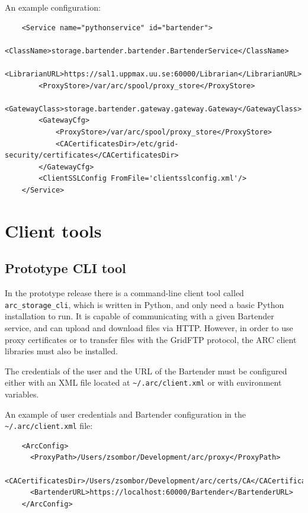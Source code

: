 \documentclass{book}
\begin{document}
An example configuration:

\begin{verbatim}
    <Service name="pythonservice" id="bartender">
        <ClassName>storage.bartender.bartender.BartenderService</ClassName>
        <LibrarianURL>https://sal1.uppmax.uu.se:60000/Librarian</LibrarianURL>
        <ProxyStore>/var/arc/spool/proxy_store</ProxyStore>
        <GatewayClass>storage.bartender.gateway.gateway.Gateway</GatewayClass>
        <GatewayCfg>
            <ProxyStore>/var/arc/spool/proxy_store</ProxyStore>
            <CACertificatesDir>/etc/grid-security/certificates</CACertificatesDir>
        </GatewayCfg>
        <ClientSSLConfig FromFile='clientsslconfig.xml'/>
    </Service>
\end{verbatim}


\newpage

\section{Client tools} %
\label{sec:client_tools}

\subsection{Prototype CLI tool} %
\label{sub:prototype_cli_tool}

In the prototype release there is a command-line client tool called \verb!arc_storage_cli!, which is written in Python, and only need a basic Python installation to run. It is capable of communicating with a given Bartender service, and can upload and download files via HTTP. However, in order to use proxy certificates or to transfer files with the GridFTP protocol, the ARC client libraries must also be installed.

The credentials of the user and the URL of the Bartender must be configured either with an XML file located at \verb!~/.arc/client.xml! or with environment variables.

An example of user credentials and Bartender configuration in the \verb!~/.arc/client.xml! file:

\begin{verbatim}
    <ArcConfig>
      <ProxyPath>/Users/zsombor/Development/arc/proxy</ProxyPath>
      <CACertificatesDir>/Users/zsombor/Development/arc/certs/CA</CACertificatesDir>
      <BartenderURL>https://localhost:60000/Bartender</BartenderURL>
    </ArcConfig>
\end{verbatim}
\end{document}
